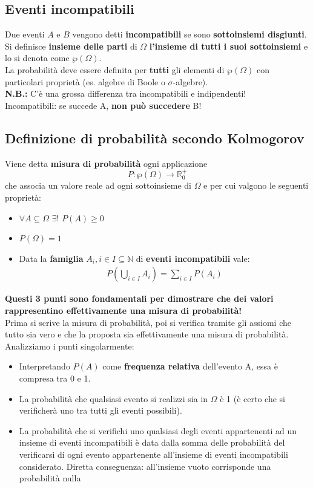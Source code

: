 \subsection{Eventi incompatibili}
Due eventi $A$ e $B$ vengono detti \textbf{incompatibili} se sono \textbf{sottoinsiemi disgiunti}.  \\
Si definisce \textbf{insieme delle parti} di $\Omega$ \textbf{l'insieme di tutti i suoi sottoinsiemi} e lo si denota come $\wp (\Omega)$. \\
La probabilità deve essere definita per \textbf{tutti} gli elementi di $\wp (\Omega)$ con particolari proprietà (es. algebre di Boole o $\sigma$-algebre). \\
\textbf{N.B.:} C'è una grossa differenza tra incompatibili e indipendenti! \\
Incompatibili: se succede A, \textbf{non può succedere} B!

\subsection{Definizione di probabilità secondo Kolmogorov}
Viene detta \textbf{misura di probabilità} ogni applicazione 
\[
P: \wp(\Omega) \rightarrow \mathbb{R}_0^+
\]
che associa un valore reale ad ogni sottoinsieme di $\Omega$ e per cui valgono le seguenti proprietà:
\begin{itemize}
	\item $\forall A \subseteq \Omega$  $\exists!$ $P(A) \geq 0$
	\item $P(\Omega) = 1$
	\item Data la \textbf{famiglia} $A_i, i \in I \subseteq \mathbb{N}$ di \textbf{eventi incompatibili} vale:
	\begin{align}
		P(\bigcup_{i \in I} A_i) = \sum_{i \in I} P(A_i)
	\end{align}
\end{itemize}
\textbf{Questi 3 punti sono fondamentali per dimostrare che dei valori rappresentino effettivamente una misura di probabilità!} \\
Prima si scrive la misura di probabilità, poi si verifica tramite gli assiomi che tutto sia vero e che la proposta sia effettivamente una misura di probabilità.
\\
Analizziamo i punti singolarmente:
\begin{itemize}
	\item Interpretando $P(A)$ come \textbf{frequenza relativa} dell'evento A, essa è
compresa tra 0 e 1.
	\item La probabilità che qualsiasi evento si realizzi sia in $\Omega$ è 1 (è certo
che si verificherà uno tra tutti gli eventi possibili). 
	\item 
La probabilità che si verifichi uno qualsiasi degli eventi appartenenti ad un insieme di eventi incompatibili è data dalla somma delle probabilità del verificarsi di ogni evento appartenente all'insieme di eventi incompatibili considerato. Diretta conseguenza: all'insieme vuoto corrisponde una probabilità nulla
\end{itemize}

